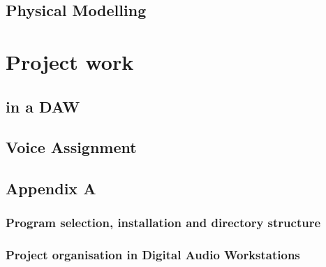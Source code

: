 \documentclass[11pt]{article}
\begin{document}
\subsection{Physical Modelling}
\label{sec:orgf4b3a97}

\section{Project work}
\label{sec:orgfbc2e36}
\subsection{in a DAW}
\label{sec:orgd224526}
\subsection{Voice Assignment}
\label{sec:org9c70960}

\subsection{Appendix A}
\label{sec:orge941d6a}
\subsubsection{Program selection, installation and directory structure}
\label{sec:org1b13973}
\subsubsection{Project organisation in Digital Audio Workstations}
\label{sec:orgf5e6b04}
\end{document}
